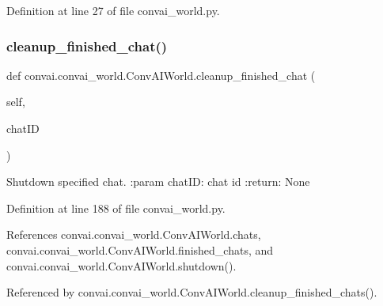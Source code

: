 Definition at line 27 of file convai\+\_\+world.\+py.

\mbox{\label{classconvai_1_1convai__world_1_1ConvAIWorld_adbed66ef531f264abbee71de82ed38b8}} 
\subsubsection{\texorpdfstring{cleanup\+\_\+finished\+\_\+chat()}{cleanup\_finished\_chat()}}
{\footnotesize\ttfamily def convai.\+convai\+\_\+world.\+Conv\+A\+I\+World.\+cleanup\+\_\+finished\+\_\+chat (\begin{DoxyParamCaption}\item[{}]{self,  }\item[{}]{chat\+ID }\end{DoxyParamCaption})}

\begin{DoxyVerb}Shutdown specified chat.
:param chatID: chat id
:return: None
\end{DoxyVerb}
 

Definition at line 188 of file convai\+\_\+world.\+py.



References convai.\+convai\+\_\+world.\+Conv\+A\+I\+World.\+chats, convai.\+convai\+\_\+world.\+Conv\+A\+I\+World.\+finished\+\_\+chats, and convai.\+convai\+\_\+world.\+Conv\+A\+I\+World.\+shutdown().



Referenced by convai.\+convai\+\_\+world.\+Conv\+A\+I\+World.\+cleanup\+\_\+finished\+\_\+chats().

